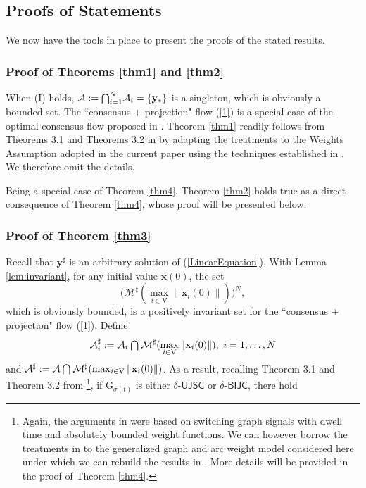 \documentclass[a4paper, 11pt]{article}
\newcommand*\mcap{\mathbin{\mathpalette\mcapinn\relax}}
\newcommand*\mcapinn[2]{\vcenter{\hbox{$\mathsurround=0pt
  \ifx\displaystyle#1\textstyle\else#1\fi\bigcap$}}}
\begin{document}
\subsection{Proofs of Statements}
We  now have the tools in place to present the proofs of the stated results.
\subsubsection{Proof of Theorems \ref{thm1} and \ref{thm2}}
When (I) holds, $
\mathcal{A}:= \mcap_{i=1}^N\mathcal{A}_i=\{\mathbf{y}_\ast\}
$ is a singleton, which is obviously a bounded set. The ``consensus + projection" flow (\ref{1}) is a special case of the optimal consensus flow proposed in \cite{shitac}. Theorem \ref{thm1} readily follows  from Theorems 3.1 and Theorems 3.2 in \cite{shitac} by adapting the treatments to the Weights Assumption adopted  in the current paper using the techniques established in \cite{shisiam}. We therefore omit the details.

Being a special case of  Theorem \ref{thm4},  Theorem \ref{thm2} holds true as a direct consequence of Theorem \ref{thm4}, whose proof will be presented below.

\subsubsection{Proof of Theorem \ref{thm3}}
Recall that $\mathbf{y}^\sharp$  is  an arbitrary solution of (\ref{LinearEquation}). With Lemma \ref{lem:invariant}, for any initial value $\mathbf{x}(0)$,   the set
$$
\big(\mathcal{M}^\sharp(\max_{i\in\mathrm{V}}\|\mathbf{x}_i(0)\|)\big)^{N},
$$
which  is  obviously bounded, is a positively invariant set for the ``consensus + projection" flow (\ref{1}). Define $$
\mathcal{A}_i^\sharp:=\mathcal{A}_i \mcap\mathcal{M}^\sharp(\max_{i\in\mathrm{V}}\|\mathbf{x}_i(0)\|),\ i=1,\dots,N
$$
and $\mathcal{A}^\sharp:=\mathcal{A} \mcap\mathcal{M}^\sharp(\max_{i\in\mathrm{V}}\|\mathbf{x}_i(0)\|)$.  As a result,  recalling  Theorem 3.1 and Theorem 3.2 from \cite{shitac}\footnote{Again, the arguments in \cite{shitac} were based on switching graph signals with dwell time and absolutely bounded weight functions. We can however borrow the treatments in \cite{shisiam} to the generalized graph and arc weight model considered here under which we can rebuild the results in \cite{shitac}. More details will be provided in the proof of Theorem \ref{thm4}.   }, if $\mathrm{G}_{\sigma(t)}$ is either  $\delta$-$\mathsf{UJSC}$ or $\delta$-$\mathsf{BIJC}$, there hold
\end{document}
